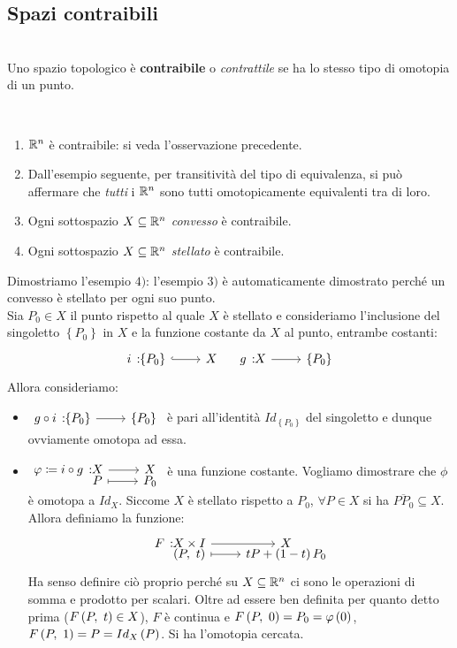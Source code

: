 \subsection{Spazi contraibili}
\begin{define}~{}\\
	Uno spazio topologico è \textbf{contraibile} o \textit{contrattile} se ha lo stesso tipo di omotopia di un punto.
\end{define}
\begin{examples}~{}
	\begin{enumerate}
		\item $\mathbb{R}^n$ è contraibile: si veda l'osservazione precedente.
		\item Dall'esempio seguente, per transitività del tipo di equivalenza, si può affermare che \textit{tutti} i $\mathbb{R}^n$ sono tutti omotopicamente equivalenti tra di loro.
		\item Ogni sottospazio $X\subseteq \mathbb{R}^n$ \textit{convesso} è contraibile.
		\item Ogni sottospazio $X\subseteq \mathbb{R}^n$ \textit{stellato} è contraibile.
	\end{enumerate}
\vspace{-3mm}
\end{examples}
\begin{demonstration}
	Dimostriamo l'esempio $4)$: l'esempio $3)$ è automaticamente dimostrato perché un convesso è stellato per ogni suo punto.\\
	Sia $P_0\in X$ il punto rispetto al quale $X$ è stellato e consideriamo l'inclusione del singoletto $\left\{P_0\right\}$ in $X$ e la funzione costante da $X$ al punto, entrambe costanti:
	\begin{equation*}
		\incl{i}{\left\{P_0\right\}}{X}\quad \funz{g}{X}{\left\{P_0\right\}}
	\end{equation*}
Allora consideriamo:
\begin{itemize}
	\item $\funz{g\circ i}{\left\{P_0\right\}}{\left\{P_0\right\}}$ è pari all'identità $Id_{\left\{P_0\right\}}$ del singoletto e dunque ovviamente omotopa ad essa.
	\item $\funztot{\phi\coloneqq i\circ g}{X}{X}{P}{P_0}$ è una funzione costante. Vogliamo dimostrare che $\phi$ è omotopa a $Id_X$. Siccome $X$ è stellato rispetto a $P_0$, $\forall P\in X$ si ha $\overline{PP_0}\subseteq X$. Allora definiamo la funzione:
	\begin{equation*}
		\funztot{F}{X\times I}{X}{\left(P,\ t\right)}{tP+\left(1-t\right)P_0}
	\end{equation*}
Ha senso definire ciò proprio perché su $X\subseteq \mathbb{R}^n$ ci sono le operazioni di somma e prodotto per scalari. Oltre ad essere ben definita per quanto detto prima ($F\left(P,\ t\right)\in X$), $F$ è continua e $F\left(P,\ 0\right)=P_0=\varphi\left(0\right)$, $F\left(P,\ 1\right)=P=Id_X\left(P\right)$. Si ha l'omotopia cercata.
\end{itemize}
\vspace{-3mm}
\end{demonstration}
